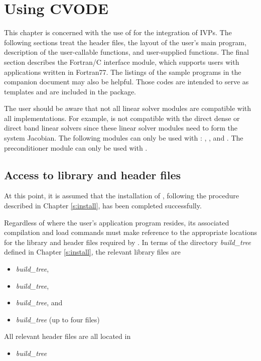 \chapter{Using CVODE}\label{s:simulation}

This chapter is concerned with the use of {\cvode} for the integration
of IVPs.  The following sections treat the header files, the layout of
the user's main program, description of the {\cvode} user-callable
functions, and user-supplied functions.  The final section describes
the Fortran/C interface module, which supports users with applications
written in Fortran77.  The listings of the sample programs in the
companion document \cite{cvode2.2.0_ex} may also be helpful.  Those
codes are intended to serve as templates and are included in the
{\cvode} package.

The user should be aware that not all linear solver modules are compatible 
with all {\nvector} implementations. 
For example, {\nvecp} is not compatible with the direct dense or direct band 
linear solvers since these linear solver modules need to form the system
Jacobian.  The following {\cvode} modules can only be used with {\nvecs}:
{\cvdense}, {\cvband}, and {\cvbandpre}. The preconditioner module {\cvbbdpre}
can only be used with {\nvecp}. 

\section{Access to library and header files}\label{ss:file_access}

At this point, it is assumed that the installation of {\cvode},
following the procedure described in Chapter \ref{s:install}, has
been completed successfully.

Regardless of where the user's application program resides, its
associated compilation and load commands must make reference to the
appropriate locations for the library and header files required by
{\cvode}.  In terms of the directory {\em build\_tree} defined in
Chapter \ref{s:install}, the relevant library files are
\begin{itemize}
\item {\em build\_tree},
\item {\em build\_tree},
\item {\em build\_tree}, and
\item {\em build\_tree} (up to four files)
\end{itemize}
All relevant header files are all located in
\begin{itemize}
\item {\em build\_tree}
\end{itemize}

